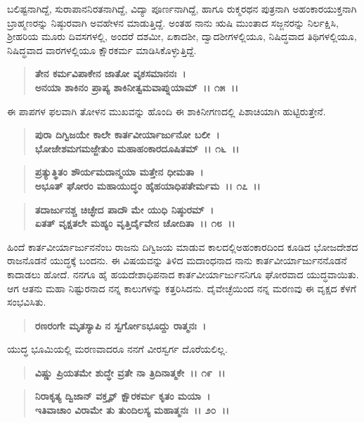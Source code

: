 ಬಲಿಷ್ಟನಾಗಿದ್ದೆ, ಸುರಾಪಾನನಿರತನಾಗಿದ್ದೆ, ವಿದ್ಯಾ ಪೂರ್ಣನಾಗಿದ್ದೆ, ಹಾಗೂ ರುಕ್ಮರಥನ ಪುತ್ರನಾಗಿ ಅಹಂಕಾರಯುಕ್ತನಾಗಿ ಬ್ರಾಹ್ಮಣರನ್ನು ನಿಷ್ಠುರವಾಗಿ ಅವಹೇಳನ ಮಾಡುತ್ತಿದ್ದೆ. ಅಂತಹ ನಾನು ಋಷಿ ಮುಂತಾದ ಸಜ್ಜನರನ್ನು ನಿರ್ಲಕ್ಷಿಸಿ, ಶ‍್ರೀಹರಿಯ ಮೂರು ದಿವಸಗಳಲ್ಲಿ, ಅಂದರೆ ದಶಮೀ, ಏಕಾದಶೀ, ದ್ವಾದಶೀಗಳಲ್ಲಿಯೂ, ನಿಷಿದ್ಧವಾದ ತಿಥಿಗಳಲ್ಲಿಯೂ, ನಿಷಿದ್ಧವಾದ ವಾರಗಳಲ್ಲಿಯೂ ಕ್ಷೌರಕರ್ಮ ಮಾಡಿಸಿಕೊಳ್ಳುತ್ತಿದ್ದೆ.

\begin{verse}
\textbf{ತೇನ ಕರ್ಮವಿಪಾಕೇನ ಜಾತೋ ವೃಕಸಮಾನನಃ~।}\\\textbf{ಅನಯಾ ಶಾಕಿನಂ ಪ್ರಾಪ್ಯ ಶಾಕಿನೀತ್ವಮವಾಪ್ನುಯಾಮ್~।। ೧೫~।।} 
\end{verse}

ಈ ಪಾಪಗಳ ಫಲವಾಗಿ ತೋಳನ ಮುಖವನ್ನು ಹೊಂದಿ ಈ ಶಾಕಿನೀಗಣದಲ್ಲಿ ಪಿಶಾಚಿಯಾಗಿ ಹುಟ್ಟಿರುತ್ತೇನೆ.

\begin{verse}
\textbf{ಪುರಾ ದಿಗ್ವಿಜಯೇ ಕಾಲೇ ಕಾರ್ತವೀರ್ಯಾರ್ಜುನೋ ಬಲೀ~।}\\\textbf{ಭೋಜೇಶಮಗಮಜ್ಜೇತುಂ ಮಹಾಹಂಕಾರದೂಷಿತಮ್~।। ೧೬~।।} 
\end{verse}

\begin{verse}
\textbf{ಪ್ರತ್ಯುತ್ಥಿತಂ ಶೌರ್ಯಮದಾನ್ಮಯಾ ಮತ್ತೇನ ಧೀಮತಾ~।}\\\textbf{ಅಭೂತ್ ಘೋರಂ ಮಹಾಯುದ್ಧಂ ಹೈಹಯಾಧಿಪತೇರ್ಮಮ~।। ೧೭~।।} 
\end{verse}

\begin{verse}
\textbf{ತದಾರ್ಜುನಶ್ಚ ಚಿಚ್ಛೇದ ಪಾದೌ ಮೇ ಯುಧಿ ನಿಷ್ಠುರಮ್~।}\\\textbf{ಏತತ್ ವೃಕ್ಷತಲೇ ಮಹ್ಯಂ ವೃತ್ತಿರ್ದೈವೇನ ಚೋದಿತಾ~।। ೧೮~।। }
\end{verse}

ಹಿಂದೆ ಕಾರ್ತವೀರ್ಯಾರ್ಜುನನೆಂಬ ರಾಜನು ದಿಗ್ವಿಜಯ ಮಾಡುವ ಕಾಲದಲ್ಲಿ\break ಅಹಂಕಾರದಿಂದ ಕೂಡಿದ ಭೋಜದೇಶದ ರಾಜನೊಡನೆ ಯುದ್ಧಕ್ಕೆ ಬಂದನು. ಈ ವಿಷಯವನ್ನು ತಿಳಿದ ಮದಾಂಧನಾದ ನಾನು ಕಾರ್ತವೀರ್ಯಾರ್ಜುನನೊಡನೆ ಕಾದಾಡಲು ಹೋದೆ. ನನಗೂ ಹೈ ಹಯದೇಶಾಧಿಪನಾದ ಕಾರ್ತವೀರ್ಯಾರ್ಜುನನಿಗೂ ಘೋರವಾದ ಯುದ್ಧ\-ವಾಯಿತು. ಆಗ ಆತನು ಮಹಾ ನಿಷ್ಟುರನಾದ ನನ್ನ ಕಾಲುಗಳನ್ನು ಕತ್ತರಿಸಿದನು. ದೈವೇಚ್ಛೆಯಿಂದ ನನ್ನ ಮರಣವು ಈ ವೃಕ್ಷದ ಕೆಳಗೆ ಸಂಭವಿಸಿತು.

\begin{verse}
\textbf{ರಣರಂಗೇ ಮೃತಸ್ಯಾಪಿ ನ ಸ್ವರ್ಗೋಽಭೂದ್ದು ರಾತ್ಮನಃ~।}
\end{verse}

ಯುದ್ಧ ಭೂಮಿಯಲ್ಲಿ ಮರಣವಾದರೂ ನನಗೆ ವೀರಸ್ವರ್ಗ ದೊರೆಯಲಿಲ್ಲ.

\begin{verse}
\textbf{ವಿಷ್ಣು ಪ್ರಿಯತಮೇ ಶುದ್ಧೇ ವ್ರತೇ ನಾ ತ್ರಿದಿನಾತ್ಮಕೇ~।। ೧೯~।।} 
\end{verse}

\begin{verse}
\textbf{ನಿರಾಕೃತ್ಯ ದ್ವಿಜಾನ್ ವಕ್ತೄನ್ ಕ್ಷೌರಕರ್ಮ ಕೃತಂ ಮಯಾ~।}\\\textbf{ಇತಿವಾಚಾಂ ವಿರಾಮೇ ತು ತುಂದಿಲಸ್ಯ ಮಹಾತ್ಮನಃ~।। ೨೦~।। }
\end{verse}

